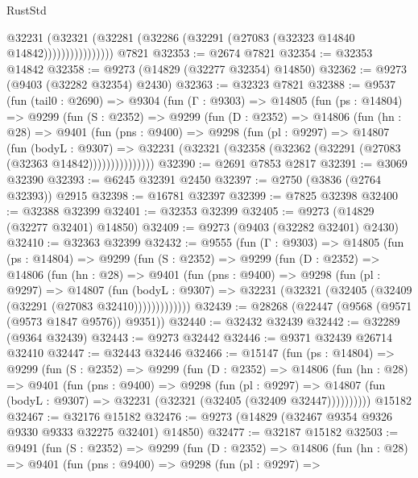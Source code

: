 \begin{lexlean}{RustStd}
\begin{coremodule}
{\begin{coremodule}
{{{{{{{{{{{{{{{{{{{{{{{{{{{{{{{{{{{{{{{{{{{{{{{{{{{{{{{                      @32231
                        (@32321
                          (@32281 (@32286 (@32291 (@27083 (@32323 @14840 @14842))))))))))))))))
    @7821
@32353 := @2674 @7821
@32354 := @32353 @14842
@32358 := @9273 (@14829 (@32277 @32354) @14850)
@32362 := @9273 (@9403 (@32282 @32354) @2430)
@32363 := @32323 @7821
@32388 := @9537
    (fun (tail0 : @2690) =>
    @9304
      (fun (Γ : @9303) =>
      @14805
        (fun (ps : @14804) =>
        @9299
          (fun (S : @2352) =>
          @9299
            (fun (D : @2352) =>
            @14806
              (fun (hn : @28) =>
              @9401
                (fun (pns : @9400) =>
                @9298
                  (fun (pl : @9297) =>
                  @14807
                    (fun (bodyL : @9307) =>
                    @32231 (@32321 (@32358 (@32362 (@32291 (@27083 (@32363 @14842)))))))))))))))
@32390 := @2691 @7853 @2817
@32391 := @3069 @32390
@32393 := @6245 @32391 @2450
@32397 := @2750 (@3836 (@2764 @32393)) @2915
@32398 := @16781 @32397
@32399 := @7825 @32398
@32400 := @32388 @32399
@32401 := @32353 @32399
@32405 := @9273 (@14829 (@32277 @32401) @14850)
@32409 := @9273 (@9403 (@32282 @32401) @2430)
@32410 := @32363 @32399
@32432 := @9555
    (fun (Γ : @9303) =>
    @14805
      (fun (ps : @14804) =>
      @9299
        (fun (S : @2352) =>
        @9299
          (fun (D : @2352) =>
          @14806
            (fun (hn : @28) =>
            @9401
              (fun (pns : @9400) =>
              @9298
                (fun (pl : @9297) =>
                @14807
                  (fun (bodyL : @9307) =>
                  @32231 (@32321 (@32405 (@32409 (@32291 (@27083 @32410)))))))))))))
@32439 := @28268 (@22447 (@9568 (@9571 (@9573 @1847 @9576)) @9351))
@32440 := @32432 @32439
@32442 := @32289 (@9364 @32439)
@32443 := @9273 @32442
@32446 := @9371 @32439 @26714 @32410
@32447 := @32443 @32446
@32466 := @15147
    (fun (ps : @14804) =>
    @9299
      (fun (S : @2352) =>
      @9299
        (fun (D : @2352) =>
        @14806
          (fun (hn : @28) =>
          @9401
            (fun (pns : @9400) =>
            @9298
              (fun (pl : @9297) =>
              @14807 (fun (bodyL : @9307) => @32231 (@32321 (@32405 (@32409 @32447))))))))))
    @15182
@32467 := @32176 @15182
@32476 := @9273 (@14829 (@32467 @9354 @9326 @9330 @9333 @32275 @32401) @14850)
@32477 := @32187 @15182
@32503 := @9491
    (fun (S : @2352) =>
    @9299
      (fun (D : @2352) =>
      @14806
        (fun (hn : @28) =>
        @9401
          (fun (pns : @9400) =>
          @9298
            (fun (pl : @9297) =>
}}}}}}}}}}}}}}}}}}}}}}}}}}}}}}}}}}}}}}}}}}}}}}}}}}}}}}}
\end{coremodule}}
\end{coremodule}
\end{lexlean}
